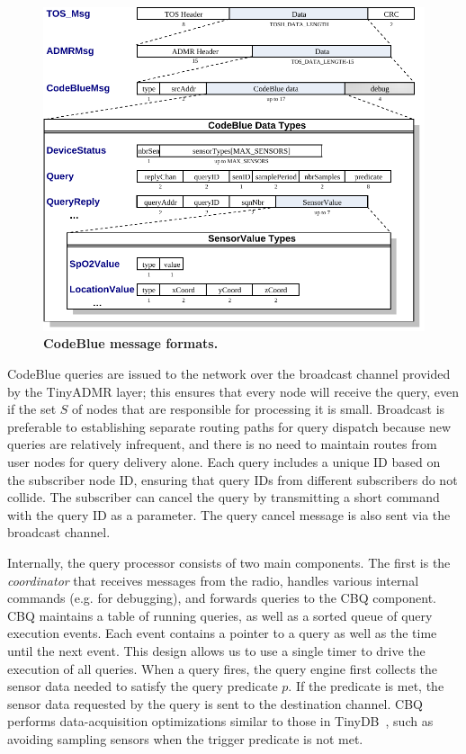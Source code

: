 \begin{figure}[t]
\begin{center}
\includegraphics[width=0.8\hsize]{./resources/codeblue-nsdi06/figures/codeBlueMsgs.pdf}
\end{center}
\caption{\small {\bf CodeBlue message formats.}}
\label{fig-codeblue-msgs}
\end{figure}

CodeBlue queries are issued to the network over the broadcast channel provided by
the TinyADMR layer; this ensures that every node will receive the query,
even if the set $S$ of nodes that are responsible for processing it is
small. Broadcast is preferable to establishing separate routing paths
for query dispatch because new queries are relatively infrequent, and
there is no need to maintain routes from user nodes for
query delivery alone.  Each query includes a unique ID based on the
subscriber node ID, ensuring that query IDs from different subscribers
do not collide.  The subscriber can cancel the query by transmitting a
short command with the query ID as a parameter.  The query cancel
message is also sent via the broadcast channel.

Internally, the query processor consists of two main components.  The
first is the {\em coordinator} that receives messages from the radio,
handles various internal commands (e.g. for debugging), and forwards
queries to the CBQ component.  CBQ maintains a table of running
queries, as well as a sorted queue of query execution events.  Each
event contains a pointer to a query as well as the time until the next
event.  This design allows us to use a single timer to drive the
execution of all queries. When a query fires, the query engine first
collects the sensor data needed to satisfy the query predicate $p$. If
the predicate is met, the sensor data requested by the query is sent
to the destination channel. CBQ performs data-acquisition
optimizations similar to those in TinyDB~\cite{tinydb-osdi}, such as
avoiding sampling sensors when the trigger predicate is not met.

